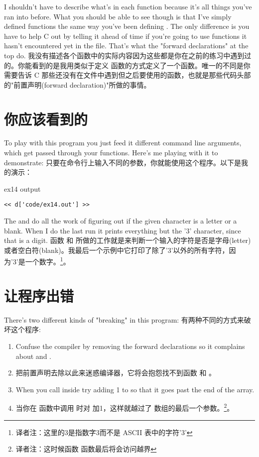 I shouldn't have to describe what's in each function because it's all
things you've ran into before.  What you should be able to see though
is that I've simply defined functions the same way you've been defining
.  The only difference is you have to help C out by telling
it ahead of time if you're going to use functions it hasn't encountered
yet in the file.  That's what the "forward declarations" at the top do.
我没有描述各个函数中的实际内容因为这些都是你在之前的练习中遇到过的。你能看到的是我用类似于定义  函数的方式定义了一个函数。唯一的不同是你需要告诉 C 那些还没有在文件中遇到但之后要使用的函数，也就是那些代码头部的"前置声明(forward declaration)"所做的事情。

\section{你应该看到的}

To play with this program you just feed it different command line 
arguments, which get passed through your functions.  Here's me
playing with it to demonstrate:
只要在命令行上输入不同的参数，你就能使用这个程序。以下是我的演示：
\begin{code}{ex14 output}
\begin{lstlisting}
<< d['code/ex14.out'] >>
\end{lstlisting}
\end{code}

The  and  do all the work of figuring
out if the given character is a letter or a blank.  When I do the
last run it prints everything but the '3' character, since that 
is a digit.
函数  和  所做的工作就是来判断一个输入的字符是否是字母(letter)或者空白符(blank)。我最后一个示例中它打印了除了'3'以外的所有字符，因为'3'是一个数字。\footnote{译者注：这里的3是指数字3而不是 ASCII 表中的字符'3'}。
\section{让程序出错}

There's two different kinds of "breaking" in this program:
有两种不同的方式来破坏这个程序:
\begin{enumerate}
\item Confuse the compiler by removing the forward declarations
    so it complains about  and .
\item 把前置声明去除以此来迷惑编译器，它将会抱怨找不到函数  和 。
\item When you call  inside  try
    adding 1 to  so that it goes past the end of the
     array.
\item 当你在  函数中调用  时对  加1，这样就越过了  数组的最后一个参数。\footnote{译者注：这时候函数  函数最后将会访问越界}。
\end{enumerate}


